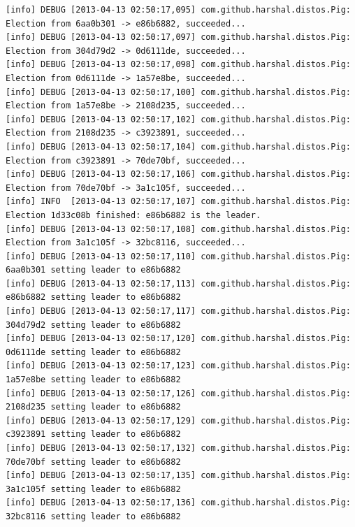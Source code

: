 \documentclass[]{article}
\begin{document}
\begin{verbatim}
[info] DEBUG [2013-04-13 02:50:17,095] com.github.harshal.distos.Pig: Election from 6aa0b301 -> e86b6882, succeeded...
[info] DEBUG [2013-04-13 02:50:17,097] com.github.harshal.distos.Pig: Election from 304d79d2 -> 0d6111de, succeeded...
[info] DEBUG [2013-04-13 02:50:17,098] com.github.harshal.distos.Pig: Election from 0d6111de -> 1a57e8be, succeeded...
[info] DEBUG [2013-04-13 02:50:17,100] com.github.harshal.distos.Pig: Election from 1a57e8be -> 2108d235, succeeded...
[info] DEBUG [2013-04-13 02:50:17,102] com.github.harshal.distos.Pig: Election from 2108d235 -> c3923891, succeeded...
[info] DEBUG [2013-04-13 02:50:17,104] com.github.harshal.distos.Pig: Election from c3923891 -> 70de70bf, succeeded...
[info] DEBUG [2013-04-13 02:50:17,106] com.github.harshal.distos.Pig: Election from 70de70bf -> 3a1c105f, succeeded...
[info] INFO  [2013-04-13 02:50:17,107] com.github.harshal.distos.Pig: Election 1d33c08b finished: e86b6882 is the leader.
[info] DEBUG [2013-04-13 02:50:17,108] com.github.harshal.distos.Pig: Election from 3a1c105f -> 32bc8116, succeeded...
[info] DEBUG [2013-04-13 02:50:17,110] com.github.harshal.distos.Pig: 6aa0b301 setting leader to e86b6882
[info] DEBUG [2013-04-13 02:50:17,113] com.github.harshal.distos.Pig: e86b6882 setting leader to e86b6882
[info] DEBUG [2013-04-13 02:50:17,117] com.github.harshal.distos.Pig: 304d79d2 setting leader to e86b6882
[info] DEBUG [2013-04-13 02:50:17,120] com.github.harshal.distos.Pig: 0d6111de setting leader to e86b6882
[info] DEBUG [2013-04-13 02:50:17,123] com.github.harshal.distos.Pig: 1a57e8be setting leader to e86b6882
[info] DEBUG [2013-04-13 02:50:17,126] com.github.harshal.distos.Pig: 2108d235 setting leader to e86b6882
[info] DEBUG [2013-04-13 02:50:17,129] com.github.harshal.distos.Pig: c3923891 setting leader to e86b6882
[info] DEBUG [2013-04-13 02:50:17,132] com.github.harshal.distos.Pig: 70de70bf setting leader to e86b6882
[info] DEBUG [2013-04-13 02:50:17,135] com.github.harshal.distos.Pig: 3a1c105f setting leader to e86b6882
[info] DEBUG [2013-04-13 02:50:17,136] com.github.harshal.distos.Pig: 32bc8116 setting leader to e86b6882
\end{verbatim}
\normalsize
\end{document}
